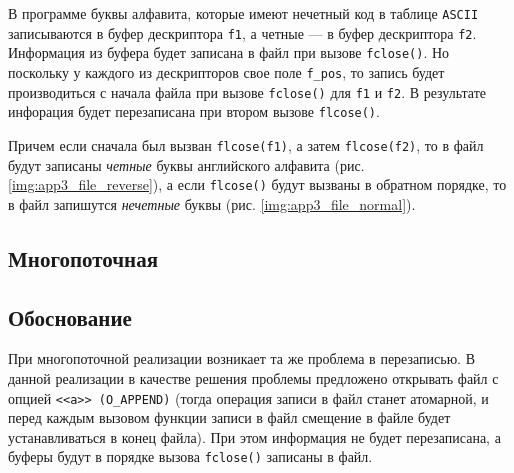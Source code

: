 В программе буквы алфавита, которые имеют нечетный код в таблице \texttt{ASCII} записываются в буфер дескриптора \texttt{f1}, а четные --- в буфер дескриптора \texttt{f2}. Информация из буфера будет записана в файл при вызове \texttt{fclose()}. Но поскольку у каждого из дескрипторов свое поле \texttt{f\_pos}, то запись будет производиться с начала файла при вызове \texttt{fclose()} для \texttt{f1} и \texttt{f2}. В результате инфорация будет перезаписана при втором вызове \texttt{flcose()}.

Причем если сначала был вызван \texttt{flcose(f1)}, а затем \texttt{flcose(f2)}, то в файл будут записаны \textit{четные} буквы английского алфавита (рис. \ref{img:app3_file_reverse}), а если \texttt{flcose()} будут вызваны в обратном порядке, то в файл запишутся \textit{нечетные} буквы (рис. \ref{img:app3_file_normal}).





\subsection{Многопоточная}

\begin{center}
    \captionsetup{justification=raggedright,singlelinecheck=off}
    
\end{center}

\vspace{-1.5cm}
\subsection{Обоснование}
\vspace{-0.7cm}

При многопоточной реализации возникает та же проблема в перезаписью. В данной реализации в качестве решения проблемы предложено открывать файл с опцией \texttt{<<a>> (O\_APPEND)} (тогда операция записи в файл станет атомарной, и перед каждым вызовом функции записи в файл смещение в файле будет устанавливаться в конец файла). При этом информация не будет перезаписана, а буферы будут в порядке вызова \texttt{fclose()} записаны в файл.


